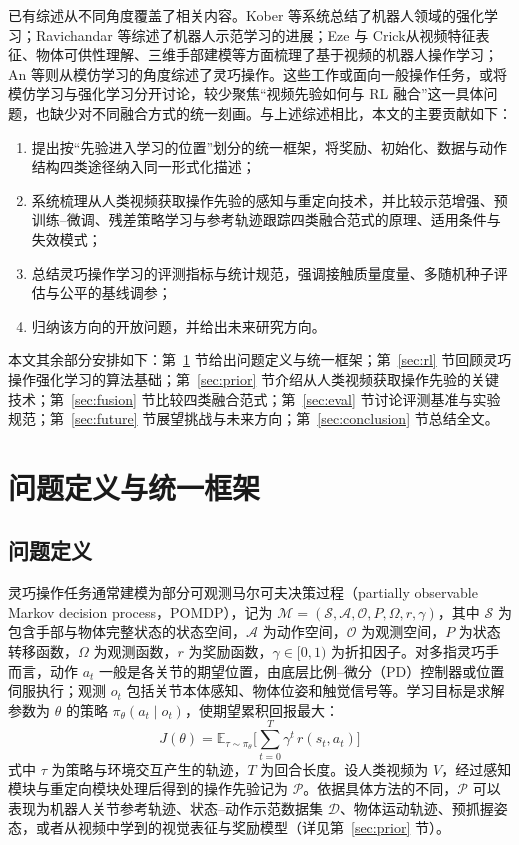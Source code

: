 \documentclass[UTF8,a4paper,zihao=-4]{ctexart}
\begin{document}
已有综述从不同角度覆盖了相关内容。Kober 等\cite{kober2013}系统总结了机器人领域的强化学习；Ravichandar 等\cite{ravichandar2020}综述了机器人示范学习的进展；Eze 与 Crick\cite{eze2024}从视频特征表征、物体可供性理解、三维手部建模等方面梳理了基于视频的机器人操作学习；An 等\cite{an2025}则从模仿学习的角度综述了灵巧操作。这些工作或面向一般操作任务，或将模仿学习与强化学习分开讨论，较少聚焦“视频先验如何与 RL 融合”这一具体问题，也缺少对不同融合方式的统一刻画。与上述综述相比，本文的主要贡献如下：
\begin{enumerate}
  \item 提出按“先验进入学习的位置”划分的统一框架，将奖励、初始化、数据与动作结构四类途径纳入同一形式化描述；
  \item 系统梳理从人类视频获取操作先验的感知与重定向技术，并比较示范增强、预训练–微调、残差策略学习与参考轨迹跟踪四类融合范式的原理、适用条件与失效模式；
  \item 总结灵巧操作学习的评测指标与统计规范，强调接触质量度量、多随机种子评估与公平的基线调参；
  \item 归纳该方向的开放问题，并给出未来研究方向。
\end{enumerate}

本文其余部分安排如下：第~\ref{sec:framework} 节给出问题定义与统一框架；第~\ref{sec:rl} 节回顾灵巧操作强化学习的算法基础；第~\ref{sec:prior} 节介绍从人类视频获取操作先验的关键技术；第~\ref{sec:fusion} 节比较四类融合范式；第~\ref{sec:eval} 节讨论评测基准与实验规范；第~\ref{sec:future} 节展望挑战与未来方向；第~\ref{sec:conclusion} 节总结全文。

\section{问题定义与统一框架}\label{sec:framework}

\subsection{问题定义}

灵巧操作任务通常建模为部分可观测马尔可夫决策过程（partially observable Markov decision process，POMDP），记为 $\mathcal{M}=(\mathcal{S},\mathcal{A},\mathcal{O},P,\Omega,r,\gamma)$，其中 $\mathcal{S}$ 为包含手部与物体完整状态的状态空间，$\mathcal{A}$ 为动作空间，$\mathcal{O}$ 为观测空间，$P$ 为状态转移函数，$\Omega$ 为观测函数，$r$ 为奖励函数，$\gamma\in[0,1)$ 为折扣因子。对多指灵巧手而言，动作 $a_t$ 一般是各关节的期望位置，由底层比例–微分（PD）控制器或位置伺服执行；观测 $o_t$ 包括关节本体感知、物体位姿和触觉信号等。学习目标是求解参数为 $\theta$ 的策略 $\pi_\theta(a_t\mid o_t)$，使期望累积回报最大：
\begin{equation}\label{eq:objective}
  J(\theta)=\mathbb{E}_{\tau\sim\pi_{\theta}}\Big[\sum_{t=0}^{T}\gamma^{t}\,r(s_{t},a_{t})\Big]
\end{equation}
式中 $\tau$ 为策略与环境交互产生的轨迹，$T$ 为回合长度。设人类视频为 $V$，经过感知模块与重定向模块处理后得到的操作先验记为 $\mathcal{P}$。依据具体方法的不同，$\mathcal{P}$ 可以表现为机器人关节参考轨迹、状态–动作示范数据集 $\mathcal{D}$、物体运动轨迹、预抓握姿态，或者从视频中学到的视觉表征与奖励模型（详见第~\ref{sec:prior} 节）。
\end{document}
